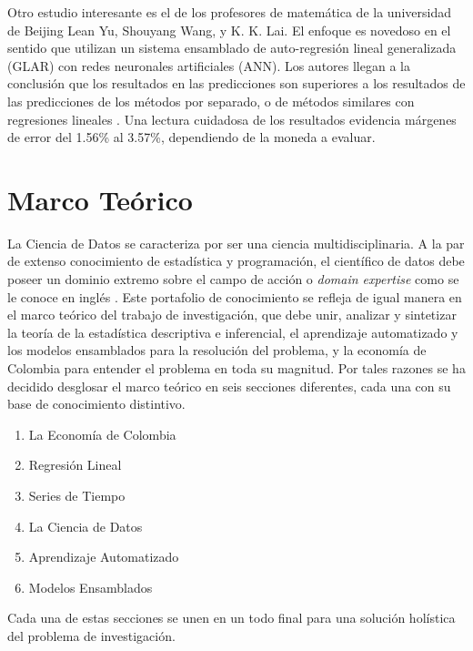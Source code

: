 Otro estudio interesante es el de los profesores de matemática de la universidad de Beijing Lean Yu, Shouyang Wang, y K. K. Lai. El enfoque es novedoso en el sentido que utilizan un sistema ensamblado de auto-regresión lineal generalizada (GLAR) con redes neuronales artificiales (ANN). Los autores llegan a la conclusión que los resultados en las predicciones son superiores a los resultados de las predicciones de los métodos por separado, o de métodos similares con regresiones lineales \cite{yuWangLai}. Una lectura cuidadosa de los resultados evidencia márgenes de error del 1.56\% al 3.57\%, dependiendo de la moneda a evaluar.

\section{Marco Teórico}
La Ciencia de Datos se caracteriza por ser una ciencia multidisciplinaria. A la par de extenso conocimiento de estadística y programación, el científico de datos debe poseer un dominio extremo sobre el campo de acción o \textit{domain expertise} como se le conoce en inglés \cite{pengMatsui}. Este portafolio de conocimiento se refleja de igual manera en el marco teórico del trabajo de investigación, que debe unir, analizar y sintetizar la teoría de la estadística descriptiva e inferencial, el aprendizaje automatizado y los modelos ensamblados para la resolución del problema, y la economía de Colombia para entender el problema en toda su magnitud. Por tales razones se ha decidido desglosar el marco teórico en seis secciones diferentes, cada una con su base de conocimiento distintivo.

\begin{enumerate}
    \item La Economía de Colombia
    \item Regresión Lineal
    \item Series de Tiempo
    \item La Ciencia de Datos
    \item Aprendizaje Automatizado
    \item Modelos Ensamblados
\end{enumerate}

Cada una de estas secciones se unen en un todo final para una solución holística del problema de investigación.
